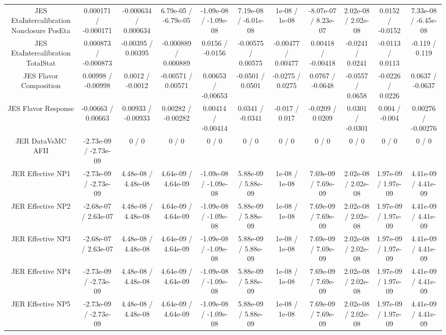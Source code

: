 \begin{table}[htbp]
\begin{center}
\begin{tabular}{|c|c|c|c|c|c|c|c|c|c|c|}
  JES EtaIntercalibration Nonclosure PosEta & 0.000171 / -0.000171 & -0.000634 / 0.000634 & 6.79e-05 / -6.79e-05 & -1.09e-08 / -1.09e-08 & 7.19e-08 / -6.01e-08 & 1e-08 / 1e-08 & -8.07e-07 / 8.23e-07 & 2.02e-08 / 2.02e-08 & 0.0152 / -0.0152 & 7.33e-08 / -6.45e-08 \\ 
  JES EtaIntercalibration TotalStat & 0.000873 / -0.000873 & -0.00395 / 0.00395 & -0.000889 / 0.000889 & 0.0156 / -0.0156 & -0.00575 / 0.00575 & -0.00477 / 0.00477 & 0.00418 / -0.00418 & -0.0241 / 0.0241 & -0.0113 / 0.0113 & -0.119 / 0.119 \\ 
  JES Flavor Composition & 0.00998 / -0.00998 & 0.0012 / -0.0012 & -0.00571 / 0.00571 & 0.00653 / -0.00653 & -0.0501 / 0.0501 & -0.0275 / 0.0275 & 0.0767 / -0.0648 & -0.0557 / 0.0658 & -0.0226 / 0.0226 & 0.0637 / -0.0637 \\ 
  JES Flavor Response & -0.00663 / 0.00663 & 0.00933 / -0.00933 & 0.00282 / -0.00282 & 0.00414 / -0.00414 & 0.0341 / -0.0341 & -0.017 / 0.017 & -0.0209 / 0.0209 & 0.0301 / -0.0301 & 0.004 / -0.004 & 0.00276 / -0.00276 \\ 
  JER DataVsMC AFII & -2.73e-09 / -2.73e-09 & 0 / 0 & 0 / 0 & 0 / 0 & 0 / 0 & 0 / 0 & 0 / 0 & 0 / 0 & 0 / 0 & 0 / 0 \\ 
  JER Effective NP1 & -2.73e-09 / -2.73e-09 & 4.48e-08 / 4.48e-08 & 4.64e-09 / 4.64e-09 & -1.09e-08 / -1.09e-08 & 5.88e-09 / 5.88e-09 & 1e-08 / 1e-08 & 7.69e-09 / 7.69e-09 & 2.02e-08 / 2.02e-08 & 1.97e-09 / 1.97e-09 & 4.41e-09 / 4.41e-09 \\ 
  JER Effective NP2 & -2.68e-07 / 2.63e-07 & 4.48e-08 / 4.48e-08 & 4.64e-09 / 4.64e-09 & -1.09e-08 / -1.09e-08 & 5.88e-09 / 5.88e-09 & 1e-08 / 1e-08 & 7.69e-09 / 7.69e-09 & 2.02e-08 / 2.02e-08 & 1.97e-09 / 1.97e-09 & 4.41e-09 / 4.41e-09 \\ 
  JER Effective NP3 & -2.68e-07 / 2.63e-07 & 4.48e-08 / 4.48e-08 & 4.64e-09 / 4.64e-09 & -1.09e-08 / -1.09e-08 & 5.88e-09 / 5.88e-09 & 1e-08 / 1e-08 & 7.69e-09 / 7.69e-09 & 2.02e-08 / 2.02e-08 & 1.97e-09 / 1.97e-09 & 4.41e-09 / 4.41e-09 \\ 
  JER Effective NP4 & -2.73e-09 / -2.73e-09 & 4.48e-08 / 4.48e-08 & 4.64e-09 / 4.64e-09 & -1.09e-08 / -1.09e-08 & 5.88e-09 / 5.88e-09 & 1e-08 / 1e-08 & 7.69e-09 / 7.69e-09 & 2.02e-08 / 2.02e-08 & 1.97e-09 / 1.97e-09 & 4.41e-09 / 4.41e-09 \\ 
  JER Effective NP5 & -2.73e-09 / -2.73e-09 & 4.48e-08 / 4.48e-08 & 4.64e-09 / 4.64e-09 & -1.09e-08 / -1.09e-08 & 5.88e-09 / 5.88e-09 & 1e-08 / 1e-08 & 7.69e-09 / 7.69e-09 & 2.02e-08 / 2.02e-08 & 1.97e-09 / 1.97e-09 & 4.41e-09 / 4.41e-09 \\ 

\end{tabular}
\end{center}
\end{table}
